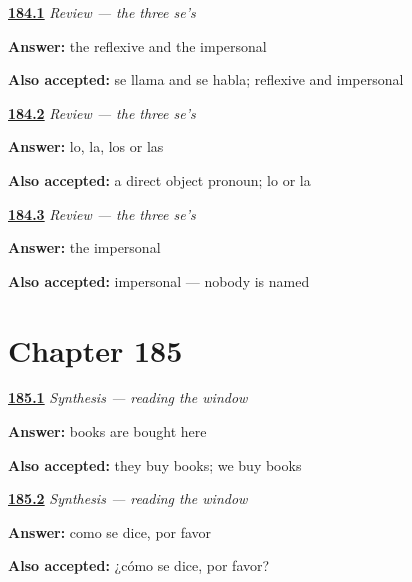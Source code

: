 \noindent\begin{minipage}[t]{\linewidth}
\raggedright
\hyperlink{review-ES-C52-tres-ses-two}{\textbf{184.1}} \emph{Review — the three se's}\par
\small \textbf{Answer:} the reflexive and the impersonal\par
\footnotesize \textbf{Also accepted:} se llama and se habla; reflexive and impersonal
\end{minipage}\par\medskip

\noindent\begin{minipage}[t]{\linewidth}
\raggedright
\hyperlink{review-ES-C52-tres-ses-test}{\textbf{184.2}} \emph{Review — the three se's}\par
\small \textbf{Answer:} lo, la, los or las\par
\footnotesize \textbf{Also accepted:} a direct object pronoun; lo or la
\end{minipage}\par\medskip

\noindent\begin{minipage}[t]{\linewidth}
\raggedright
\hyperlink{review-ES-C52-tres-ses-which}{\textbf{184.3}} \emph{Review — the three se's}\par
\small \textbf{Answer:} the impersonal\par
\footnotesize \textbf{Also accepted:} impersonal — nobody is named
\end{minipage}\par\medskip

\section*{Chapter 185}

\noindent\begin{minipage}[t]{\linewidth}
\raggedright
\hyperlink{review-ES-C52-sintesis-el-letrero-read}{\textbf{185.1}} \emph{Synthesis — reading the window}\par
\small \textbf{Answer:} books are bought here\par
\footnotesize \textbf{Also accepted:} they buy books; we buy books
\end{minipage}\par\medskip

\noindent\begin{minipage}[t]{\linewidth}
\raggedright
\hyperlink{review-ES-C52-sintesis-el-letrero-unknown}{\textbf{185.2}} \emph{Synthesis — reading the window}\par
\small \textbf{Answer:} como se dice, por favor\par
\footnotesize \textbf{Also accepted:} ¿cómo se dice, por favor?
\end{minipage}\par\medskip

